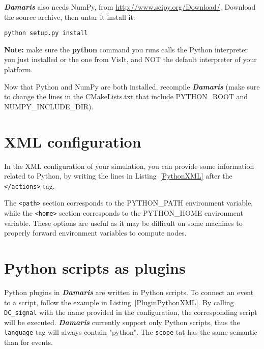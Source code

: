 \documentclass[11pt]{report}
\newcommand{\Damaris}{\emph{\textbf{Damaris}}}
\newcommand{\function}[1]{\texttt{#1}}
\begin{document}
\Damaris{} also needs NumPy, from \url{http://www.scipy.org/Download/}. Download the source archive,
then untar it install it:

\begin{verbatim}
python setup.py install
\end{verbatim}
\textbf{Note:} make sure the \textbf{python} command you runs calls the Python interpreter you just installed
or the one from VisIt, and NOT the default interpreter of your platform.

Now that Python and NumPy are both installed, recompile \Damaris{} (make sure to change
the lines in the CMakeLists.txt that include PYTHON\_ROOT and NUMPY\_INCLUDE\_DIR).

\section{XML configuration}

In the XML configuration of your simulation, you can provide some information related to
Python, by writing the lines in Listing~\ref{PythonXML} after the \texttt{</actions>} tag.

\noindent\begin{minipage}{\textwidth}
\vspace{0.5cm}

\end{minipage}

The \texttt{<path>} section corresponds to the PYTHON\_PATH environment variable,
while the \texttt{<home>} section corresponds to the PYTHON\_HOME environment variable.
These options are useful as it may be difficult on some machines to properly forward environment
variables to compute nodes.

\section{Python scripts as plugins}

Python plugins in \Damaris{} are written in Python scripts. To connect an event to
a script, follow the example in Listing~\ref{PluginPythonXML}. By calling \function{DC\_signal}
with the name provided in the configuration, the corresponding script will be executed.
\Damaris{} currently support only Python scripts, thus the \texttt{language} tag will always contain
"python". The \texttt{scope} tat has the same semantic than for events.
\end{document}
